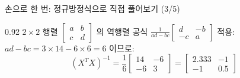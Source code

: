 \begin{frame}{손으로 한 번: 정규방정식으로 직접 풀어보기 (3/5)}
\begin{center}\begin{varwidth}{0.92\textwidth}
  $2 \times 2$ 행렬 $\begin{bmatrix}a&b\\c&d\end{bmatrix}$ 의
  역행렬 공식 $\frac{1}{ad-bc}\begin{bmatrix}d&-b\\-c&a\end{bmatrix}$
  적용: $ad-bc = 3\times14-6\times6 = 6$ 이므로:
  \[
  (X^TX)^{-1} = \frac{1}{6}\begin{bmatrix}14&-6\\-6&3\end{bmatrix}
  = \begin{bmatrix}2.333&-1\\-1&0.5\end{bmatrix}
  \]
\end{varwidth}\end{center}
\end{frame}
